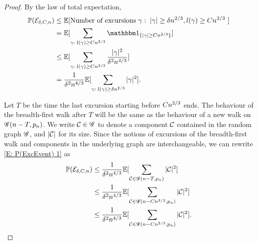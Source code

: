 \begin{proof}
	By the law of total expectation,
	\begin{equation} \label{E: P(ExcEvent) 1}
	\begin{aligned}
	\Prob(\ExcursionEvent) 
	&\leq \Exp{ \text{Number of excursions $\gamma: \; |\gamma| \geq \delta\n{2}{3},l(\gamma) \geq C\n{2}{3}$ } } \\
	&= \Exp{ \sum_{\gamma: \; l(\gamma) \geq C\n{2}{3}} \Ind{\{|\gamma| \geq C\n{2}{3} \} } } \\
	&\leq \Exp{ \sum_{\gamma: \; l(\gamma) \geq C\n{2}{3}} \frac{|\gamma|^2}{\delta^2\n{4}{3}} } \\
	&= \frac{1}{\delta^2\n{4}{3}} \Exp{ \sum_{\gamma: \; l(\gamma) \geq \delta\n{2}{3}}  |\gamma|^2 }.
	\end{aligned}
	\end{equation}
	
	Let $T$ be the time the last excursion starting before $Cn^{2 / 3}$ ends.
	The behaviour of the breadth-first walk after $T$ will be the same as the behaviour of a new walk on $\mathscr{G}(n-T, p_n)$.
	We write $\mathcal{C} \in \mathscr{G}$ to denote a component $\mathcal{C}$ contained in the random graph $\mathscr{G}$,
	and $|\mathcal{C}|$ for its size.
	Since the notions of excursions of the breadth-first walk and components in the underlying graph are interchangeable,
	we can rewrite \eqref{E: P(ExcEvent) 1} as
	\begin{equation} \label{E: P(ExcEvent) 2}
	\begin{aligned}
	\mathbb{P}(\mathcal{E}_{\delta, C, n}) 
	&\leq \frac{1}{\delta^2n^{4 / 3}} \mathbb{E}[ \sum_{\mathcal{C} \in \mathscr{G}(n-T, p_n)}  |\mathcal{C}|^2  ] \\
	&\leq \frac{1}{\delta^2n^{4 / 3}} \mathbb{E}[ \sum_{\mathcal{C} \in \mathscr{G}(n-Cn^{2 / 3}, p_n)}  |\mathcal{C}|^2  ] \\
	&\leq \frac{1}{\delta^2n^{4 / 3}} \mathbb{E}[ \sum_{\mathcal{C} \in \mathscr{G}(n-Cn^{2 / 3}, p_n)}  |\mathcal{C}|^2 ].
	\end{aligned}
	\end{equation}
	

\end{proof}
